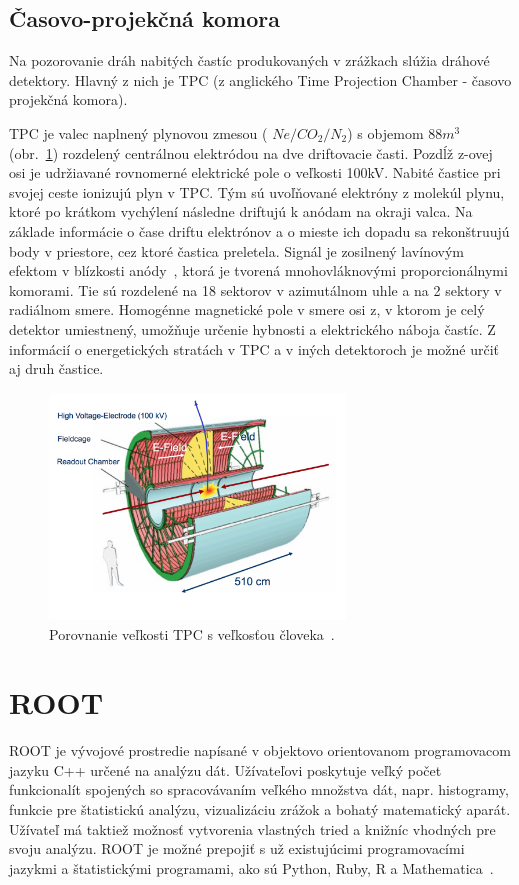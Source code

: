 \documentclass[thesismargins, thesislinespacing]{rnthesis}
\begin{document}
\subsection{Časovo-projekčná komora}
\label{textTPC}
Na pozorovanie dráh nabitých častíc produkovaných v zrážkach slúžia dráhové detektory. Hlavný z nich je TPC (z anglického Time Projection Chamber - časovo projekčná komora).

TPC je valec naplnený plynovou zmesou ( $Ne/CO_2/N_2$) s objemom $88m^3$ (obr.~\ref{tpc}) rozdelený centrálnou elektródou na dve driftovacie časti. Pozdĺž z-ovej osi je udržiavané rovnomerné elektrické pole o veľkosti 100kV. Nabité častice pri svojej ceste ionizujú plyn v TPC. Tým sú uvoľňované elektróny z molekúl plynu, ktoré po krátkom vychýlení následne driftujú k anódam na okraji valca. Na základe informácie o čase driftu elektrónov a o mieste ich dopadu sa rekonštruujú body v priestore, cez ktoré častica preletela. Signál je zosilnený lavínovým efektom v blízkosti anódy~\cite{TPCobr}, ktorá je tvorená mnohovláknovými proporcionálnymi komorami. Tie sú rozdelené na 18 sektorov v azimutálnom uhle a na 2 sektory v radiálnom smere. Homogénne magnetické pole v smere osi z, v ktorom je celý detektor umiestnený, umožňuje určenie hybnosti a elektrického náboja častíc. Z informácií o energetických stratách v TPC a v iných detektoroch je možné určiť aj druh častice. 

\begin{figure}[hbtp!]
	\begin{center}
		\includegraphics[width=0.7\textwidth]{./Obrazky_praca/tpc.png}
		\caption{Porovnanie veľkosti TPC s veľkosťou človeka~\cite{TPCobr}.}
		\label{tpc}
	\end{center}
\end{figure}

\section{ROOT}
ROOT je vývojové prostredie napísané v objektovo orientovanom programovacom jazyku C++ určené na analýzu dát. Užívateľovi poskytuje veľký počet funkcionalít spojených so spracovávaním veľkého množstva dát, napr. histogramy, funkcie pre štatistickú analýzu, vizualizáciu zrážok a bohatý matematický aparát. Užívateľ má taktiež možnosť vytvorenia vlastných tried a knižníc vhodných pre svoju analýzu. ROOT je možné prepojiť s už existujúcimi programovacími jazykmi a štatistickými programami, ako sú Python, Ruby, R a Mathematica~\cite{root}.
\end{document}
